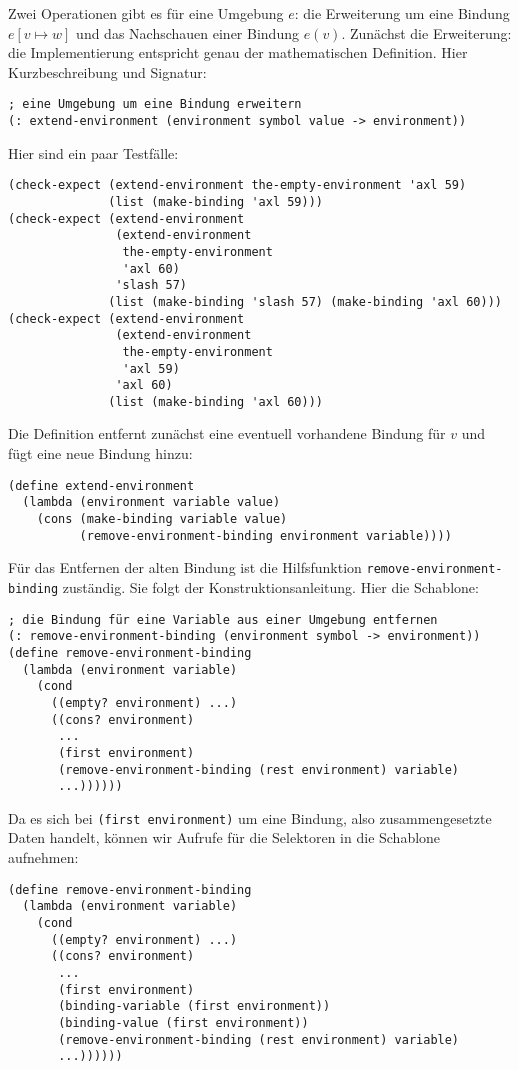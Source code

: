 Zwei Operationen gibt es für eine Umgebung $e$: die Erweiterung um
eine Bindung $e[v\mapsto w]$ und das Nachschauen einer Bindung $e(v)$.
Zunächst die Erweiterung: die Implementierung entspricht genau der
mathematischen Definition.  Hier Kurzbeschreibung und Signatur:
% 
\begin{lstlisting}
; eine Umgebung um eine Bindung erweitern
(: extend-environment (environment symbol value -> environment))
\end{lstlisting}
%
Hier sind ein paar Testfälle:
%
\begin{lstlisting}
(check-expect (extend-environment the-empty-environment 'axl 59)
              (list (make-binding 'axl 59)))
(check-expect (extend-environment
               (extend-environment
                the-empty-environment
                'axl 60)
               'slash 57)
              (list (make-binding 'slash 57) (make-binding 'axl 60)))
(check-expect (extend-environment
               (extend-environment
                the-empty-environment
                'axl 59)
               'axl 60)
              (list (make-binding 'axl 60)))
\end{lstlisting}
%
Die Definition entfernt zunächst eine eventuell vorhandene Bindung
für $v$ und fügt eine neue Bindung hinzu:
%
\begin{lstlisting}
(define extend-environment
  (lambda (environment variable value)
    (cons (make-binding variable value)
          (remove-environment-binding environment variable))))
\end{lstlisting}
%
Für das Entfernen der alten Bindung ist die Hilfsfunktion
\lstinline{remove-environment-binding} zuständig.  Sie folgt der
Konstruktionsanleitung.  Hier die Schablone:
%
\begin{lstlisting}
; die Bindung für eine Variable aus einer Umgebung entfernen
(: remove-environment-binding (environment symbol -> environment))
(define remove-environment-binding
  (lambda (environment variable)
    (cond
      ((empty? environment) ...)
      ((cons? environment)
       ...
       (first environment)
       (remove-environment-binding (rest environment) variable)
       ...))))))
\end{lstlisting}
%
Da es sich bei \lstinline{(first environment)} um eine Bindung, also
zusammengesetzte Daten handelt, können wir Aufrufe für die Selektoren
in die Schablone aufnehmen:
%
\begin{lstlisting}
(define remove-environment-binding
  (lambda (environment variable)
    (cond
      ((empty? environment) ...)
      ((cons? environment)
       ...
       (first environment)
       (binding-variable (first environment))
       (binding-value (first environment))
       (remove-environment-binding (rest environment) variable)
       ...))))))
\end{lstlisting}
